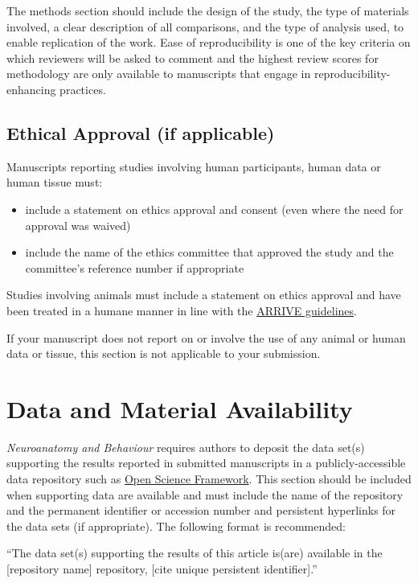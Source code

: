 \documentclass[a4paper,num-refs]{ehi-journals}
\begin{document}
The methods section should include the design of the study, the type of materials involved, a clear description of all comparisons, and the type of analysis used, to enable replication of the work. Ease of reproducibility is one of the key criteria on which reviewers will be asked to comment and the highest review scores for methodology are only available to manuscripts that engage in reproducibility-enhancing practices.

\subsection{Ethical Approval (if applicable)}
Manuscripts reporting studies involving human participants, human data or human tissue must:

\begin{itemize}
\item include a statement on ethics approval and consent (even where the need for approval was waived)
\item include the name of the ethics committee that approved the study and the committee's reference number if appropriate
\end{itemize}

Studies involving animals must include a statement on ethics approval and have been treated in a humane manner in line with the \href{http://www.nc3rs.org.uk/arrive-guidelines}{ARRIVE guidelines}.

If your manuscript does not report on or involve the use of any animal or human data or tissue, this section is not applicable to your submission.

\section{Data and Material Availability}

\textit{Neuroanatomy and Behaviour} requires authors to deposit the data set(s) supporting the results reported in submitted manuscripts in a publicly-accessible data repository such as \href{https://osf.io/}{Open Science Framework}. This section should be included when supporting data are available and must include the name of the repository and the permanent identifier or accession number and persistent hyperlinks for the data sets (if appropriate). The following format is recommended:

``The data set(s) supporting the results of this article is(are) available in the [repository name] repository, [cite unique persistent identifier].''
\end{document}
